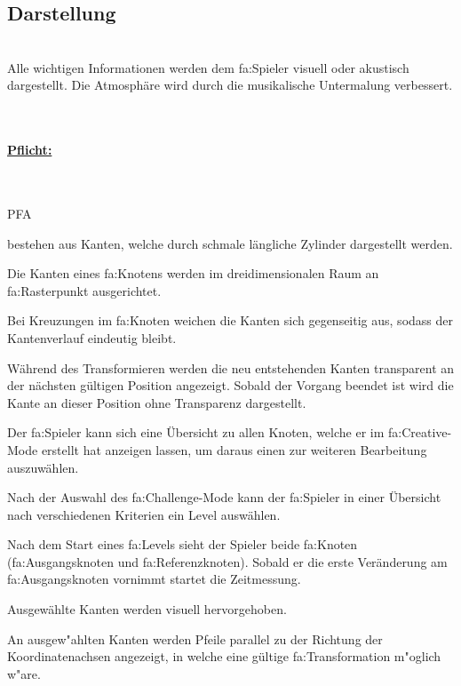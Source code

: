 %
%


\subsection{Darstellung}

%
%
\renewcommand{\K}{}
%
%

~\\
Alle wichtigen Informationen werden dem \gls{fa:Spieler} visuell oder akustisch dargestellt. Die Atmosphäre wird durch die musikalische Untermalung verbessert.

~\\

%
%
\paragraph*{\underline{Pflicht:}}~\\

\begin{ids}{\gls{PFA\K}}

	 bestehen aus Kanten, welche durch schmale längliche Zylinder dargestellt werden.
	
	\id[ 290] Die Kanten eines \gls{fa:Knoten}s werden im dreidimensionalen Raum an \gls{fa:Rasterpunkt} ausgerichtet.
	
	\id[ 300] Bei Kreuzungen im \gls{fa:Knoten} weichen die Kanten sich gegenseitig aus, sodass der Kantenverlauf eindeutig bleibt.
	
	\id[ 310] Während des Transformieren werden die neu entstehenden Kanten transparent an der nächsten gültigen Position angezeigt. Sobald der Vorgang beendet ist wird die Kante an dieser Position ohne Transparenz dargestellt.
	
	\id[ 320] Der \gls{fa:Spieler} kann sich eine Übersicht zu allen Knoten, welche er im \gls{fa:Creative}-Mode erstellt hat anzeigen lassen, um daraus einen zur weiteren Bearbeitung auszuwählen.
	
	\id[ 330] Nach der Auswahl des \gls{fa:Challenge}-Mode kann der \gls{fa:Spieler} in einer Übersicht nach verschiedenen Kriterien ein Level auswählen.
	
	\id[ 340] Nach dem Start eines \gls{fa:Level}s sieht der Spieler beide \gls{fa:Knoten} (\gls{fa:Ausgangsknoten} und \gls{fa:Referenzknoten}). Sobald er die erste Veränderung am \gls{fa:Ausgangsknoten} vornimmt startet die Zeitmessung.
	
	\id[ 350] Ausgewählte Kanten werden visuell hervorgehoben.
	
	\id[ 355] An ausgew{"a}hlten Kanten werden Pfeile parallel zu der Richtung der Koordinatenachsen angezeigt, in welche eine gültige \gls{fa:Transformation} m{"o}glich w{"a}re.
	
\end{ids}


